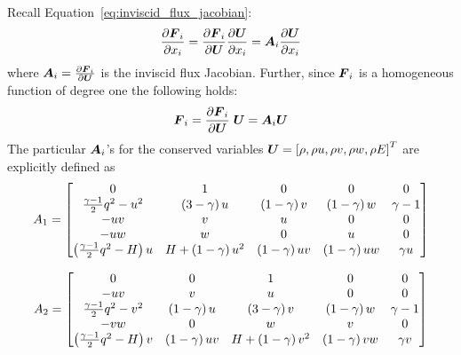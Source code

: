 Recall Equation~\eqref{eq:inviscid_flux_jacobian}:
\begin{equation*}
  {\frac{\partial{{\boldsymbol{F}}_i}}{\partial{x_i}}} =
    {\frac{\partial{{\boldsymbol{F}}_i}}{\partial{{\boldsymbol{U}}}}} {\frac{\partial{{\boldsymbol{U}}}}{\partial{x_i}}} =
      {\boldsymbol{A}}_i {\frac{\partial{{\boldsymbol{U}}}}{\partial{x_i}}}
\end{equation*}
where ${\boldsymbol{A}}_i = {\frac{\partial{{\boldsymbol{F}}_i}}{\partial{{\boldsymbol{U}}}}}$ is the inviscid flux Jacobian.  Further, since ${\boldsymbol{F}}_i$ is a homogeneous function of degree one the following holds:
\begin{equation*}
  {\boldsymbol{F}}_i =
    {\frac{\partial{{\boldsymbol{F}}_i}}{\partial{{\boldsymbol{U}}}}}\;{\boldsymbol{U}} =
      {\boldsymbol{A}}_i {\boldsymbol{U}}
\end{equation*}
The particular ${\boldsymbol{A}}_i$'s for the conserved variables ${\boldsymbol{U}}=\left[\rho, \rho u, \rho v, \rho w, \rho E \right]^T$ are explicitly defined as
\large
\begin{equation*}
  A_1 =
  \begin{bmatrix}
    0                                 & 1                      & 0                   & 0                     &  0       \\
    \frac{\gamma-1}{2}q^2-u^2             & \left(3-\gamma\right)u     & \left(1-\gamma\right)v  & \left(1-\gamma\right)w    &  \gamma-1    \\
    -uv                               & v                      & u                   & 0                     &  0       \\ 
    -uw                               & w                      & 0                   & u                     &  0       \\
    \left(\frac{\gamma-1}{2}q^2-H\right)u & H+\left(1-\gamma\right)u^2 & \left(1-\gamma\right)uv & \left(1-\gamma\right)uw   &  \gamma u
  \end{bmatrix}
\end{equation*}

\begin{equation*}
  A_2 =
  \begin{bmatrix}
    0                                 & 0                   & 1                      & 0                   & 0     \\
    -uv                               & v                   & u                      & 0                   & 0     \\
    \frac{\gamma-1}{2}q^2-v^2             & \left(1-\gamma\right)u  & \left(3-\gamma\right)v     & \left(1-\gamma\right)w  & \gamma-1  \\
    -vw                               & 0                   & w                      & v                   & 0     \\
    \left(\frac{\gamma-1}{2}q^2-H\right)v & \left(1-\gamma\right)uv & H+\left(1-\gamma\right)v^2 & \left(1-\gamma\right)vw & \gamma v
  \end{bmatrix}
\end{equation*}

